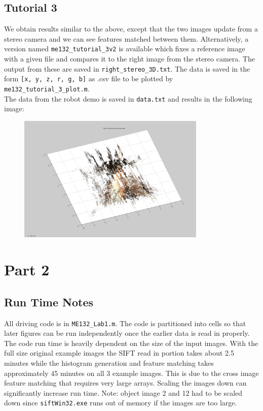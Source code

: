 \documentclass[10pt, titlepage, onecolumn, fleqn]{article}
\begin{document}
\subsection{Tutorial 3}
We obtain results similar to the above, except that the two images update from a stereo camera and we can see features matched between them. Alternatively, a version named \verb|me132_tutorial_3v2| is available which fixes a reference image with a given file and compares it to the right image from the stereo camera. The output from these are saved in \verb|right_stereo_3D.txt|. The data is saved in the form \verb|[x, y, z, r, g, b]| as .csv file to be plotted by \verb|me132_tutorial_3_plot.m|.\\
The data from the robot demo is saved in \verb|data.txt| and results in the following image:
\begin{figure}[H]
\begin{center} \includegraphics[width=0.8\textwidth]{lab01/lab01_material/part1/me132_tutorial_camera/tutorial3_image.jpg} \end{center} \label{tut3}
\end{figure}

\section{Part 2}

\subsection{Run Time Notes}
All driving code is in \verb|ME132_Lab1.m|. The code is partitioned into cells so that later figures can be run independently once the earlier data is read in properly. The code run time is heavily dependent on the size of the input images. With the full size original example images the SIFT read in portion takes about 2.5 minutes while the histogram generation and feature matching takes approximately 45 minutes on all 3 example images. This is due to the cross image feature matching that requires very large arrays. Scaling the images down can significantly increase run time.
Note: object image 2 and 12 had to be scaled down since \verb|siftWin32.exe| runs out of memory if the images are too large.
\end{document}
